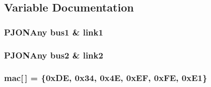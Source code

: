 \subsection{Variable Documentation}
\hypertarget{BlinkingSwitch_8ino_a23282b44f676e7ce4d3df2e799b6a78c}{
\subsubsection[{link1}]{\setlength{\rightskip}{0pt plus 5cm}P\-J\-O\-N\-Any bus1 \& link1}}\label{BlinkingSwitch_8ino_a23282b44f676e7ce4d3df2e799b6a78c}
\hypertarget{BlinkingSwitch_8ino_a3738aed90e382efb2532449d7e152c7b}{
\subsubsection[{link2}]{\setlength{\rightskip}{0pt plus 5cm}P\-J\-O\-N\-Any bus2 \& link2}}\label{BlinkingSwitch_8ino_a3738aed90e382efb2532449d7e152c7b}
\hypertarget{BlinkingSwitch_8ino_aea3f7775fecafb66a619eb2dcb0357bd}{
\subsubsection[{mac}]{ mac\mbox{[}$\,$\mbox{]} = \{0x\-D\-E, 0x34, 0x4\-E, 0x\-E\-F, 0x\-F\-E, 0x\-E1\}}}\label{BlinkingSwitch_8ino_aea3f7775fecafb66a619eb2dcb0357bd}
